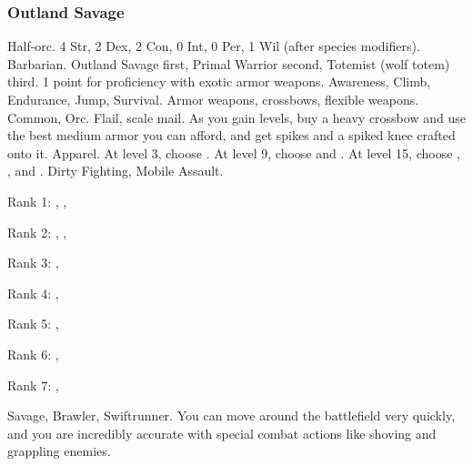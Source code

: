         \subsubsection{Outland Savage}
             Half-orc.
             4 Str, 2 Dex, 2 Con, 0 Int, 0 Per, 1 Wil (after species modifiers).
             Barbarian.
             Outland Savage first, Primal Warrior second, Totemist (wolf totem) third.
             1 point for proficiency with exotic armor weapons.
             Awareness, Climb, Endurance, Jump, Survival.
             Armor weapons, crossbows, flexible weapons.
             Common, Orc.
             Flail, scale mail. As you gain levels, buy a heavy crossbow and use the best medium armor you can afford, and get spikes and a spiked knee crafted onto it.
             Apparel.
                At level 3, choose .
                At level 9, choose  and .
                At level 15, choose , , and .
             Dirty Fighting, Mobile Assault.
            \begin{raggeditemize}
                \item Rank 1: , , 
                \item Rank 2: , , 
                \item Rank 3: , 
                \item Rank 4: , 
                \item Rank 5: , 
                \item Rank 6: , 
                \item Rank 7: , 
            \end{raggeditemize}
             Savage, Brawler, Swiftrunner.
             You can move around the battlefield very quickly, and you are incredibly accurate with special combat actions like shoving and grappling enemies.
